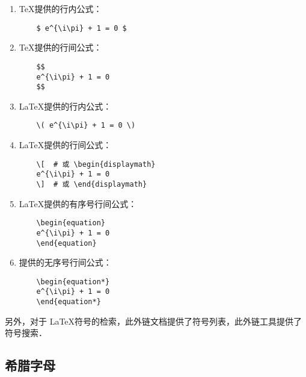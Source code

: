 \begin{enumerate}
    \item \TeX 提供的行内公式：
    \begin{verbatim}
    $ e^{\i\pi} + 1 = 0 $
    \end{verbatim}
    
    \item \TeX 提供的行间公式：
    \begin{verbatim}
    $$
    e^{\i\pi} + 1 = 0
    $$
    \end{verbatim}
    
    \item \LaTeX 提供的行内公式：
    \begin{verbatim}
    \( e^{\i\pi} + 1 = 0 \)
    \end{verbatim}
    
    \item \LaTeX 提供的行间公式：
    \begin{verbatim}
    \[  # 或 \begin{displaymath}
    e^{\i\pi} + 1 = 0
    \]  # 或 \end{displaymath}
    \end{verbatim}
    
    \item \LaTeX 提供的有序号行间公式：
    \begin{verbatim}
    \begin{equation}
    e^{\i\pi} + 1 = 0
    \end{equation}
    \end{verbatim}
    
    \item \AmS 提供的无序号行间公式：
    \begin{verbatim}
    \begin{equation*}
    e^{\i\pi} + 1 = 0
    \end{equation*}
    \end{verbatim}
\end{enumerate}

另外，对于 \LaTeX 符号的检索，此外链文档\cite{symbols}提供了符号列表，此外链工具\cite{Detexify}提供了符号搜索．


\newpage
\subsection{希腊字母}

